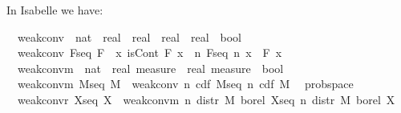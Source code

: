 \documentclass{article}
\theoremstyle{definition}
\begin{document}
In Isabelle we have:

\medskip

\begin{isabellebody}
\isamarkupfalse%
\isanewline
\ \ weak{\isacharunderscore}conv\ {\isacharcolon}{\isacharcolon}\ {\isachardoublequoteopen}{\isacharparenleft}nat\ {\isasymRightarrow}\ {\isacharparenleft}real\ {\isasymRightarrow}\ real{\isacharparenright}{\isacharparenright}\ {\isasymRightarrow}\ {\isacharparenleft}real\ {\isasymRightarrow}\ real{\isacharparenright}\ {\isasymRightarrow}\ bool{\isachardoublequoteclose}\isanewline
{}\isanewline
\ \ {\isachardoublequoteopen}weak{\isacharunderscore}conv\ F{\isacharunderscore}seq\ F\ {\isasymequiv}\ {\isasymforall}x{\isachardot}\ isCont\ F\ x\ {\isasymlongrightarrow}\ {\isacharparenleft}{\isasymlambda}n{\isachardot}\ F{\isacharunderscore}seq\ n\ x{\isacharparenright}\ {\isacharminus}{\isacharminus}{\isacharminus}{\isacharminus}{\isachargreater}\ F\ x{\isachardoublequoteclose}\isanewline\isanewline
{}\isamarkupfalse%
\isanewline
\ \ weak{\isacharunderscore}conv{\isacharunderscore}m\ {\isacharcolon}{\isacharcolon}\ {\isachardoublequoteopen}{\isacharparenleft}nat\ {\isasymRightarrow}\ real\ measure{\isacharparenright}\ {\isasymRightarrow}\ real\ measure\ {\isasymRightarrow}\ bool{\isachardoublequoteclose}\isanewline
{}\isanewline
\ \ {\isachardoublequoteopen}weak{\isacharunderscore}conv{\isacharunderscore}m\ M{\isacharunderscore}seq\ M\ {\isasymequiv}\ weak{\isacharunderscore}conv\ {\isacharparenleft}{\isasymlambda}n{\isachardot}\ cdf\ {\isacharparenleft}M{\isacharunderscore}seq\ n{\isacharparenright}{\isacharparenright}\ {\isacharparenleft}cdf\ M{\isacharparenright}{\isachardoublequoteclose}\isanewline\isanewline
{}\isamarkupfalse%
\ {\isacharparenleft}\ prob{\isacharunderscore}space{\isacharparenright}\isanewline
\ \ {\isachardoublequoteopen}weak{\isacharunderscore}conv{\isacharunderscore}r\ X{\isacharunderscore}seq\ X\ {\isasymequiv}\ weak{\isacharunderscore}conv{\isacharunderscore}m\ {\isacharparenleft}{\isasymlambda}n{\isachardot}\ distr\ M\ borel\ {\isacharparenleft}X{\isacharunderscore}seq\ n{\isacharparenright}{\isacharparenright}\ {\isacharparenleft}distr\ M\ borel\ X{\isacharparenright}{\isachardoublequoteclose}
\end{isabellebody}

\medskip
\end{document}
